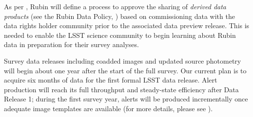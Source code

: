 As per , Rubin will define a process to approve the sharing of {\it derived data products} (see the Rubin Data Policy, ) based on commissioning data with the data rights holder community prior to the associated data preview release.
This is needed to enable the \gls{LSST} science community to begin learning about Rubin data in preparation for their survey analyses.

Survey data releases including coadded images and updated source photometry will begin about one year after the start of the full survey.
Our current plan is to acquire six months of data for the first formal \gls{LSST} data release.
Alert production will reach its full throughput and steady-state efficiency after \gls{Data Release} 1; during the first survey year, alerts will be produced incrementally once adequate image templates are available (for more details, please see ).
